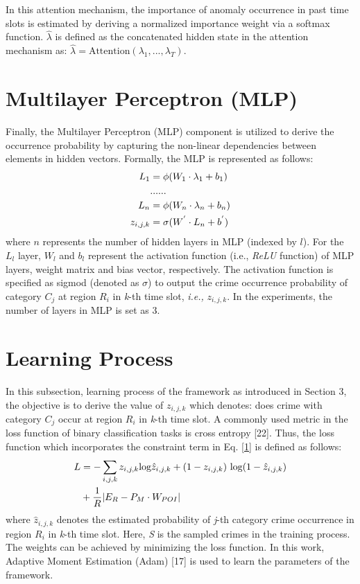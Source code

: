 In this attention mechanism, the importance of
anomaly occurrence in past time slots is estimated by deriving a normalized
importance weight via a softmax function. $\hat{\lambda}$ is defined as the concatenated hidden state in the attention mechanism as: $\hat{\lambda} = \text{Attention}(\lambda_1,...,\lambda_T)$.

\section{Multilayer Perceptron (MLP)}

Finally, the Multilayer Perceptron (MLP) component is utilized
to derive the occurrence probability by capturing the non-linear
dependencies between elements in hidden vectors. Formally, the MLP is represented as follows:
\begin{align}
            L_1 &= \phi(W_1 \cdot \lambda_1 + b_1)\notag\\
                &......\notag\\
            L_n &= \phi(W_n \cdot \lambda_n + b_n)\notag\\
            z_{i,j,k} &= \sigma(W^{'} \cdot L_n + b^{'})
\end{align}
where $n$ represents the number of hidden layers in MLP (indexed by $l$). For the $L_l$ layer, $W_l$ and $b_l$ represent the activation function
(i.e., \emph{ReLU} function) of MLP layers, weight matrix and bias vector,
respectively. The activation function is specified as sigmod (denoted as $\sigma$) to output the crime occurrence probability of category $C_j$ at region $R_i$ in \emph{k}-th time slot, \emph{i.e.,} $z_{i,j,k}$. In the experiments, the number of layers in MLP is set as 3.

\section{Learning Process}

In this subsection, learning process of the framework as introduced in Section 3, the objective is to derive the value of $z_{i,j,k}$ which denotes: does crime with category $C_j$ occur at region $R_i$ in \emph{k}-th time slot. A commonly used metric in the loss function of binary classification tasks is cross entropy [22]. Thus, the loss function which incorporates the constraint
term in Eq. \ref{1} is defined as follows:
\begin{align}
    L   &=  - \sum_{i,j,k} z_{i,j,k} \text{log}\hat{z}_{i,j,k} + (1 - z_{i,j,k}) \text{ log}(1 - \hat{z}_{i,j,k}) \notag \\
        &+  \frac{1}{R} | E_R - P_M \cdot W_{POI} |
\end{align}
where $\hat{z}_{i,j,k}$ denotes the estimated probability of \emph{j}-th category crime occurrence in region $R_i$ in \emph{k}-th time slot. Here, \emph{S} is the sampled crimes in the training process. The weights can be achieved by minimizing the loss function. In this work, Adaptive Moment
Estimation (Adam) [17] is used to learn the parameters of the framework.

